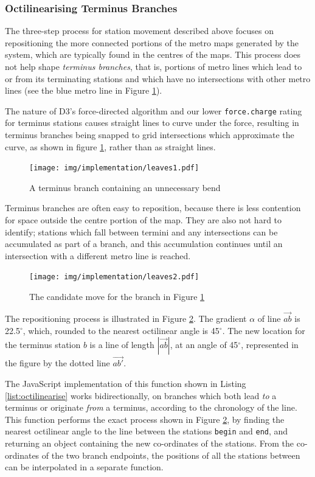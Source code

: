 \subsubsection{Octilinearising Terminus Branches} \label{sec:termini}

The three-step process for station movement described above focuses on repositioning the more connected portions of the metro maps generated by the system, which are typically found in the centres of the maps. This process does not help shape \textit{terminus branches}, that is, portions of metro lines which lead to or from its terminating stations and which have no intersections with other metro lines (see the blue metro line in Figure \ref{fig:leaves1}). 

The nature of D3's force-directed algorithm and our lower \texttt{force.charge} rating for terminus stations causes straight lines to curve under the force, resulting in terminus branches being snapped to grid intersections which approximate the curve, as shown in figure \ref{fig:leaves1}, rather than as straight lines.

\begin{figure}[htbp!]
	\centering
	\texttt{[image: img/implementation/leaves1.pdf]}
	\caption{A terminus branch containing an unnecessary bend}
	\label{fig:leaves1}
\end{figure}

Terminus branches are often easy to reposition, because there is less contention for space outside the centre portion of the map. They are also not hard to identify; stations which fall between termini and any intersections can be accumulated as part of a branch, and this accumulation continues until an intersection with a different metro line is reached. 
\begin{figure}[htbp!]
	\centering
	\texttt{[image: img/implementation/leaves2.pdf]}
	\caption{The candidate move for the branch in Figure \ref{fig:leaves1}}
	\label{fig:leaves2}
\end{figure}

The repositioning process is illustrated in Figure \ref{fig:leaves2}. The gradient $\alpha$ of line $\overrightarrow{ab}$ is 22.5$^{\circ}$, which, rounded to the nearest octilinear angle is 45$^{\circ}$. The new location for the terminus station $b$ is a line of length $|\overrightarrow{ab}|$, at an angle of 45$^{\circ}$, represented in the figure by the dotted line $\overrightarrow{ab'}$.

The JavaScript implementation of this function shown in Listing \ref{list:octilinearise} works bidirectionally, on branches which both lead \textit{to} a terminus or originate \textit{from} a terminus, according to the chronology of the line. This function performs the exact process shown in Figure \ref{fig:leaves2}, by finding the nearest octilinear angle to the line between the stations \texttt{begin} and \texttt{end}, and returning an object containing the new co-ordinates of the stations. From the co-ordinates of the two branch endpoints, the positions of all the stations between can be interpolated in a separate function.\\

